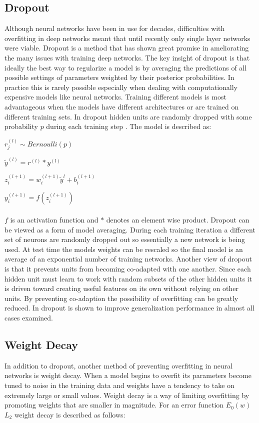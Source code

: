 \documentclass[12pt,letterpaper]{article}
\begin{document}
\subsection{Dropout}
Although neural networks have been in use for decades, difficulties with overfitting in deep networks meant that until recently only single layer networks were viable.  Dropout is a method that has shown great promise in ameliorating the many issues with training deep networks.  The key insight of dropout is that ideally the best way to regularize a model is by averaging the predictions of all possible settings of parameters weighted by their posterior probabilities. In practice this is rarely possible especially when dealing with computationally expensive models like neural networks.  Training different models is most advantageous when the models have different architectures or are trained on different training sets. In dropout hidden units are randomly dropped with some probability $p$ during each training step \cite{Srivastava:2014:DSW:2627435.2670313}.  The model is described as:


$r_j^{(l)} \sim Bernoulli(p)$

$\tilde{y}^{(l)} = r^{(l)} * y^{(l)}$

$z_i^{(l + 1)} = w_i^{(l + 1)}\tilde{y}^l + b_i^{(l + 1)}$

$y_i^{(l + 1)} = f(z_i^{(l + 1)})$
\\
\\
$f$ is an activation function and $*$ denotes an element wise product.  Dropout can be viewed as a form of model averaging.  During each training iteration a different set of neurons are randomly dropped out so essentially a new network is being used.  At test time the models weights can be rescaled so the final model is an average of an exponential number of training networks.  Another view of dropout is that it prevents units from becoming co-adapted with one another.  Since each hidden unit must learn to work with random subsets of the other hidden units it is driven toward creating useful features on its own without relying on other units.  By preventing co-adaption the possibility of overfitting can be greatly reduced.  In \cite{Srivastava:2014:DSW:2627435.2670313} dropout is shown to improve generalization performance in almost all cases examined.

\subsection{Weight Decay}
In addition to dropout, another method of preventing overfitting in neural networks is weight decay.  When a model begins to overfit its parameters become tuned to noise in the training data and weights have a tendency to take on extremely large or small values.  Weight decay is a way of limiting overfitting by promoting weights that are smaller in magnitude. For an error function $E_0(w)$ $L_2$ weight decay is described as follows:
\end{document}
